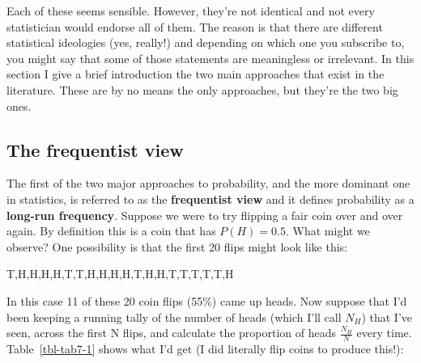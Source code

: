 \documentclass[
  letterpaper,
]{book}
\begin{document}
Each of these seems sensible. However, they're not identical and not
every statistician would endorse all of them. The reason is that there
are different statistical ideologies (yes, really!) and depending on
which one you subscribe to, you might say that some of those statements
are meaningless or irrelevant. In this section I give a brief
introduction the two main approaches that exist in the literature. These
are by no means the only approaches, but they're the two big ones.

\hypertarget{the-frequentist-view}{%
\subsection{The frequentist view}\label{the-frequentist-view}}

The first of the two major approaches to probability, and the more
dominant one in statistics, is referred to as the \textbf{frequentist
view} and it defines probability as a \textbf{long-run frequency}.
Suppose we were to try flipping a fair coin over and over again. By
definition this is a coin that has \(P(H) = 0.5\). What might we
observe? One possibility is that the first 20 flips might look like
this:

T,H,H,H,H,T,T,H,H,H,H,T,H,H,T,T,T,T,T,H

In this case 11 of these 20 coin flips (55\%) came up heads. Now suppose
that I'd been keeping a running tally of the number of heads (which I'll
call \(N_H\)) that I've seen, across the first N flips, and calculate
the proportion of heads \(\frac{N_H}{N}\) every time.
Table~\ref{tbl-tab7-1} shows what I'd get (I did literally flip coins to
produce this!):

\hypertarget{tbl-tab7-1}{}
 
  \providecommand{\huxb}[2]{\arrayrulecolor[RGB]{#1}\global\arrayrulewidth=#2pt}
  \providecommand{\huxvb}[2]{\color[RGB]{#1}\vrule width #2pt}
  \providecommand{\huxtpad}[1]{\rule{0pt}{#1}}
  \providecommand{\huxbpad}[1]{\rule[-#1]{0pt}{#1}}
\end{document}
